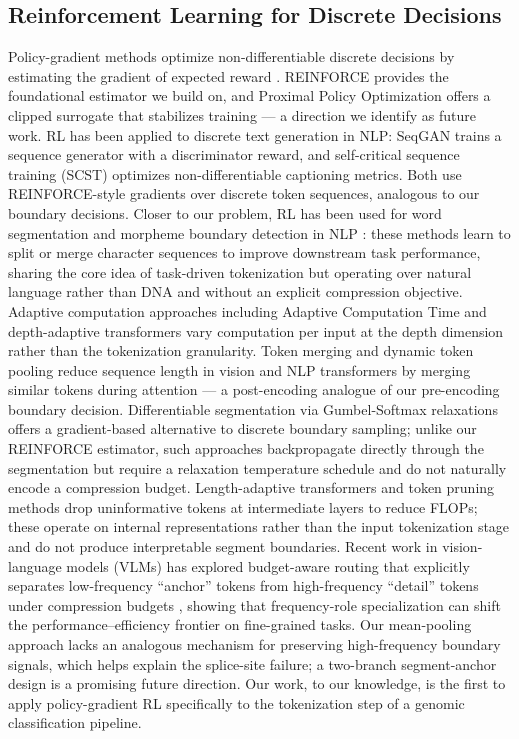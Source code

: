 \documentclass[sigconf,screen]{acmart}
\begin{document}
\subsection{Reinforcement Learning for Discrete Decisions}
Policy-gradient methods optimize non-differentiable discrete decisions by estimating the gradient of expected reward \cite{williams1992simple,sutton2018reinforcement}. REINFORCE \cite{williams1992simple} provides the foundational estimator we build on, and Proximal Policy Optimization \cite{schulman2017proximal} offers a clipped surrogate that stabilizes training — a direction we identify as future work. RL has been applied to discrete text generation in NLP: SeqGAN \cite{yu2017seqgan} trains a sequence generator with a discriminator reward, and self-critical sequence training (SCST) \cite{rennie2017self} optimizes non-differentiable captioning metrics. Both use REINFORCE-style gradients over discrete token sequences, analogous to our boundary decisions. Closer to our problem, RL has been used for word segmentation and morpheme boundary detection in NLP \cite{yang2018toward}: these methods learn to split or merge character sequences to improve downstream task performance, sharing the core idea of task-driven tokenization but operating over natural language rather than DNA and without an explicit compression objective. Adaptive computation approaches including Adaptive Computation Time \cite{graves2016adaptive} and depth-adaptive transformers \cite{elbayad2020depth} vary computation per input at the depth dimension rather than the tokenization granularity. Token merging \cite{bolya2023token} and dynamic token pooling \cite{nawrot2022dynamic} reduce sequence length in vision and NLP transformers by merging similar tokens during attention — a post-encoding analogue of our pre-encoding boundary decision. Differentiable segmentation via Gumbel-Softmax relaxations \cite{jang2017categorical} offers a gradient-based alternative to discrete boundary sampling; unlike our REINFORCE estimator, such approaches backpropagate directly through the segmentation but require a relaxation temperature schedule and do not naturally encode a compression budget. Length-adaptive transformers and token pruning methods \cite{kim2022learned} drop uninformative tokens at intermediate layers to reduce FLOPs; these operate on internal representations rather than the input tokenization stage and do not produce interpretable segment boundaries. Recent work in vision-language models (VLMs) has explored budget-aware routing that explicitly separates low-frequency ``anchor'' tokens from high-frequency ``detail'' tokens under compression budgets \cite{chen2025parcel}, showing that frequency-role specialization can shift the performance–efficiency frontier on fine-grained tasks. Our mean-pooling approach lacks an analogous mechanism for preserving high-frequency boundary signals, which helps explain the splice-site failure; a two-branch segment-anchor design is a promising future direction. Our work, to our knowledge, is the first to apply policy-gradient RL specifically to the tokenization step of a genomic classification pipeline.
\end{document}
